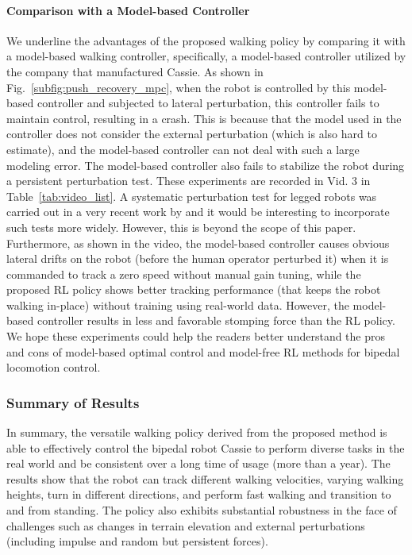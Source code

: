 \paragraph{Comparison with a Model-based Controller}
We underline the advantages of the proposed walking policy by comparing it with a model-based walking controller, specifically, a model-based controller utilized by the company that manufactured Cassie.
As shown in Fig.~\ref{subfig:push_recovery_mpc}, when the robot is controlled by this model-based controller and subjected to lateral perturbation, this controller fails to maintain control, resulting in a crash. This is because that the model used in the controller does not consider the external perturbation (which is also hard to estimate), and the model-based controller can not deal with such a large modeling error.  
The model-based controller also fails to stabilize the robot during a persistent perturbation test. 
These experiments are recorded in Vid. 3 in Table~\ref{tab:video_list}.
A systematic perturbation test for legged robots was carried out in a very recent work by \cite{van2024revisiting} and it would be interesting to incorporate such tests more widely. 
However, this is beyond the scope of this paper. 
Furthermore, as shown in the video, the model-based controller causes obvious lateral drifts on the robot (before the human operator perturbed it) when it is commanded to track a zero speed without manual gain tuning, while the proposed RL policy shows better tracking performance (that keeps the robot walking in-place) without training using real-world data. However, the model-based controller results in less and favorable stomping force than the RL policy. 
We hope these experiments could help the readers better understand the pros and cons of model-based optimal control and model-free RL methods for bipedal locomotion control.





\subsubsection{Summary of Results}
In summary, the versatile walking policy derived from the proposed method is able to effectively control the bipedal robot Cassie to perform diverse tasks in the real world and be consistent over a long time of usage (more than a year). 
The results show that the robot can track different walking velocities, varying walking heights, turn in different directions, and perform fast walking and transition to and from standing.
The policy also exhibits substantial robustness in the face of challenges such as changes in terrain elevation and external perturbations (including impulse and random but persistent forces).



